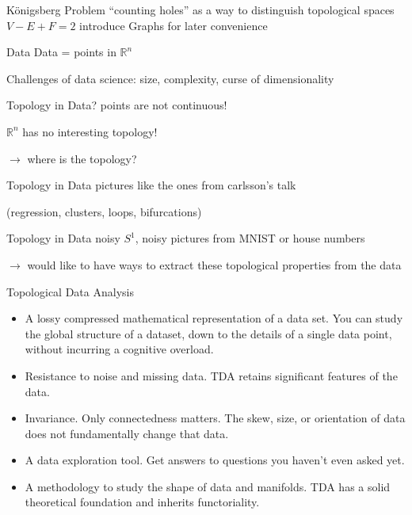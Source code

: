 \documentclass{beamer}
\begin{document}
\begin{frame}{Königsberg Problem}
``counting holes'' as a way to distinguish topological spaces
$V-E+F = 2$
introduce Graphs for later convenience
\end{frame}


\begin{frame}{Data}
Data = points in $\mathbb{R}^n$

Challenges of data science: size, complexity, curse of dimensionality
\end{frame}


\begin{frame}{Topology in Data?}
points are not continuous!

$\mathbb{R}^n$ has no interesting topology!

$\rightarrow$ where is the topology?
\end{frame}


\begin{frame}{Topology in Data}
pictures like the ones from carlsson's talk 

(regression, clusters, loops, bifurcations)
\end{frame}


\begin{frame}{Topology in Data}
noisy $S^1$, noisy pictures from MNIST or house numbers

$\rightarrow$ would like to have ways to extract these topological properties from the data
\end{frame}


\begin{frame}{Topological Data Analysis}
\begin{itemize}
	\item A lossy compressed mathematical representation of a data set. You can study the global structure of a dataset, down to the details of a single data point, without incurring a cognitive overload.
	\item Resistance to noise and missing data. TDA retains significant features of the data.
	\item Invariance. Only connectedness matters. The skew, size, or orientation of data does not fundamentally change that data.
	\item A data exploration tool. Get answers to questions you haven’t even asked yet.
  \item A methodology to study the shape of data and manifolds. TDA has a solid theoretical foundation and inherits functoriality.
\end{itemize}
\end{frame}
\end{document}

